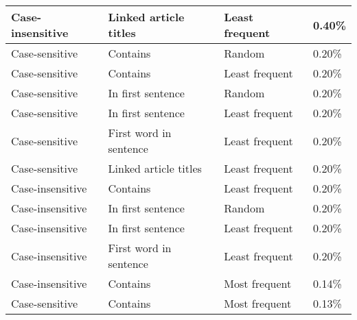 \begin{center}
\begin{table}[h]
\begin{tabular}{llll}
Case-insensitive     & Linked article titles  & Least frequent              & 0.40\%             \\ \hline
Case-sensitive       & Contains               & Random                      & 0.20\%             \\ \hline
Case-sensitive       & Contains               & Least frequent              & 0.20\%             \\ \hline
Case-sensitive       & In first sentence      & Random                      & 0.20\%             \\ \hline
Case-sensitive       & In first sentence      & Least frequent              & 0.20\%             \\ \hline
Case-sensitive       & First word in sentence & Least frequent              & 0.20\%             \\ \hline
Case-sensitive       & Linked article titles  & Least frequent              & 0.20\%             \\ \hline
Case-insensitive     & Contains               & Least frequent              & 0.20\%             \\ \hline
Case-insensitive     & In first sentence      & Random                      & 0.20\%             \\ \hline
Case-insensitive     & In first sentence      & Least frequent              & 0.20\%             \\ \hline
Case-insensitive     & First word in sentence & Least frequent              & 0.20\%             \\ \hline
Case-insensitive     & Contains               & Most frequent               & 0.14\%             \\ \hline
Case-sensitive       & Contains               & Most frequent               & 0.13\%             \\ \hline
\end{tabular}
\end{table}
\end{center}
